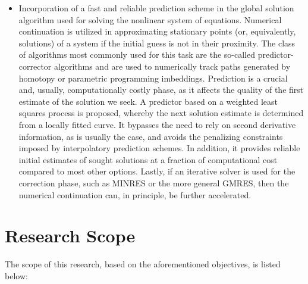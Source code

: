 \begin{itemize}
	\item Incorporation of a fast and reliable prediction scheme in the global 
	solution 
	algorithm used for solving the nonlinear system of equations. Numerical 
	continuation is utilized in approximating stationary points (or, equivalently, 
	solutions) of a system if the initial guess is not in their proximity. The class 
	of algorithms most commonly used for this task are the so-called 
	predictor-corrector algorithms and are used to numerically track paths generated 
	by homotopy or parametric programming imbeddings. Prediction is a crucial and, 
	usually, computationally costly phase, as it affects the quality of the first 
	estimate of the solution we seek. A predictor based on a weighted least squares 
	process is proposed, whereby the next solution estimate is determined from a 
	locally fitted curve. It bypasses the need to rely on second derivative 
	information, as is usually the case, and avoids the penalizing constraints 
	imposed 
	by interpolatory prediction schemes. In addition, it provides reliable initial 
	estimates of sought solutions at a fraction of computational cost compared to most 
	other options. Lastly, if an iterative solver is used for the correction 
	phase, such as MINRES or the more general GMRES, then the numerical 
	continuation can, in principle, be further accelerated.
	
\end{itemize}

\section{Research Scope}
The scope of this research, based on the aforementioned objectives, is listed below:

